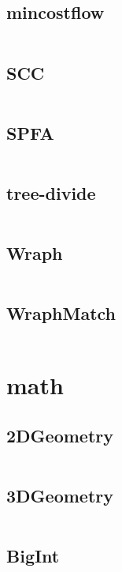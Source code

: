 \documentclass[a4]{article}
\begin{document}
\subsection{mincostflow}
\inputminted[mathescape,linenos,numbersep=5pt,frame=lines,framesep=2mm]{cpp}{src/graph/mincostflow.cpp}
\subsection{SCC}
\inputminted[mathescape,linenos,numbersep=5pt,frame=lines,framesep=2mm]{cpp}{src/graph/SCC.cpp}
\subsection{SPFA}
\inputminted[mathescape,linenos,numbersep=5pt,frame=lines,framesep=2mm]{cpp}{src/graph/SPFA.cpp}
\subsection{tree-divide}
\inputminted[mathescape,linenos,numbersep=5pt,frame=lines,framesep=2mm]{cpp}{src/graph/tree-divide.cpp}
\subsection{Wraph}
\inputminted[mathescape,linenos,numbersep=5pt,frame=lines,framesep=2mm]{cpp}{src/graph/Wraph.cpp}
\subsection{WraphMatch}
\inputminted[mathescape,linenos,numbersep=5pt,frame=lines,framesep=2mm]{cpp}{src/graph/WraphMatch.cpp}
\section{math}
\subsection{2DGeometry}
\inputminted[mathescape,linenos,numbersep=5pt,frame=lines,framesep=2mm]{cpp}{src/math/2DGeometry.cpp}
\subsection{3DGeometry}
\inputminted[mathescape,linenos,numbersep=5pt,frame=lines,framesep=2mm]{cpp}{src/math/3DGeometry.cpp}
\subsection{BigInt}
\inputminted[mathescape,linenos,numbersep=5pt,frame=lines,framesep=2mm]{cpp}{src/math/BigInt.cpp}
\end{document}
